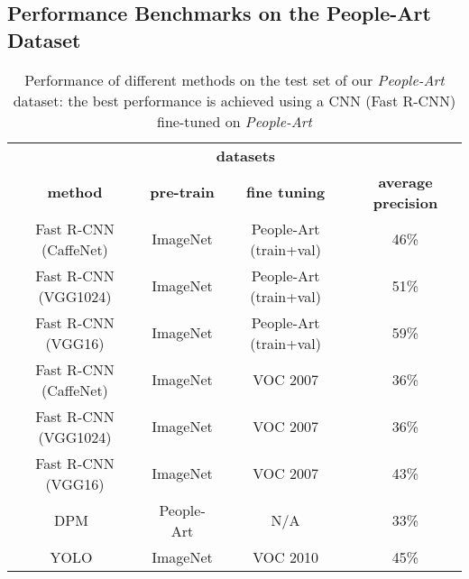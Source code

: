 \documentclass[runningheads]{llncs}
\begin{document}
\subsection{Performance Benchmarks on the People-Art Dataset}
\label{sec:peopleArtBenchmarks}
\begin{table}[b]
\begin{center}
\caption{Performance of different methods on the test set of our \textit{People-Art} dataset: the best performance is achieved using a \ac{CNN} (Fast R-CNN) fine-tuned on \textit{People-Art}\label{tbl:PerformanceBenchmarks}}
\begin{tabular}{cccc}
  \hline
  & \multicolumn{2}{c}{\textbf{datasets}} & \\
  \cline{2-3}
  \textbf{method} & \textbf{pre-train} & \textbf{fine tuning} &
  \textbf{average precision} \\
  \hline
 Fast R-CNN (CaffeNet) & ImageNet & People-Art (train+val) & 46\% \\ Fast R-CNN (VGG1024) & ImageNet & People-Art (train+val) & 51\% \\ Fast R-CNN (VGG16) & ImageNet & People-Art (train+val) & 59\% \\  \hline
 Fast R-CNN (CaffeNet) & ImageNet & VOC 2007 & 36\% \\ Fast R-CNN (VGG1024) & ImageNet & VOC 2007 & 36\% \\ Fast R-CNN (VGG16) & ImageNet & VOC 2007 & 43\% \\  \hline
 DPM~\cite{felzenszwalb2010object} & People-Art & N/A & 33\% \\
 YOLO~\cite{redmon2015you} & ImageNet & VOC 2010 & 45\% \\
  \hline

  \end{tabular} \end{center}
\end{table}
\end{document}

